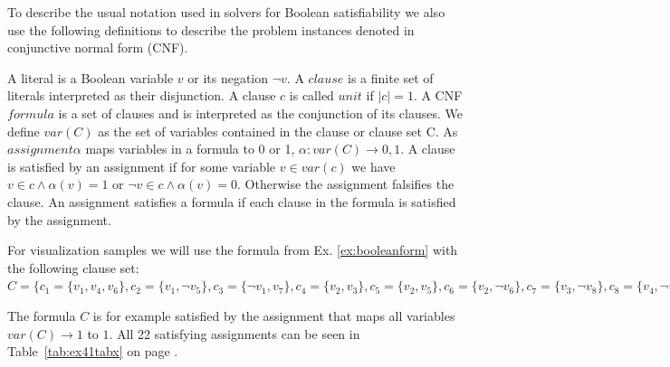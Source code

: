 \documentclass[a4paper, 12pt, bibliography=totoc]{scrartcl}
\begin{document}
To describe the usual notation used in solvers for Boolean satisfiability we also use the following definitions to describe the problem instances denoted in conjunctive normal form (CNF).

A literal is a Boolean variable $v$ or its negation $\neg v$. A $clause$ is a finite set of literals interpreted as their disjunction. A clause $c$ is called $unit$ if $|c|=1$. A CNF $formula$ is a set of clauses and is interpreted as the conjunction of its clauses. We define $var(C)$ as the set of variables contained in the clause or clause set C. As $assignment \alpha$ maps variables in a formula to 0 or 1, $\alpha : var(C)\rightarrow 0,1$. A clause is satisfied by an assignment if for some variable $v \in var(c)$ we have $v \in c \land \alpha (v)=1$ {or} $\neg v \in c \land \alpha(v)=0$. Otherwise the assignment falsifies the clause. An assignment satisfies a formula if each clause in the formula is satisfied by the assignment. \\
\begin{example}\label{ex:example41}
	For visualization samples we will use the formula from Ex. \ref{ex:booleanform} with the following clause set: $C=\{c_{1}=\{v_{1},v_{4},v_{6}\},
	c_{2}=\{v_{1},\neg v_{5}\},
	c_{3}=\{\neg v_{1},v_{7}\},
	c_{4}=\{v_{2},v_{3}\},
	c_{5}=\{v_{2},v_{5}\},
	c_{6}=\{v_{2},\neg v_{6}\},
	c_{7}=\{v_{3},\neg v_{8}\},
	c_{8}=\{v_{4},\neg v_{8}\},
	c_{9}=\{\neg v_{4},v_{6}\},
	c_{10}=\{\neg v_{4},v_{7}\}\}$
\end{example}
\vskip 12pt
The formula $C$ is for example satisfied by the assignment that maps all variables $var(C)\rightarrow 1$ to $1$. 
All 22 satisfying assignments can be seen in Table~\ref{tab:ex41tabx} on page \pageref{tab:ex41tabx}.\\
\end{document}
